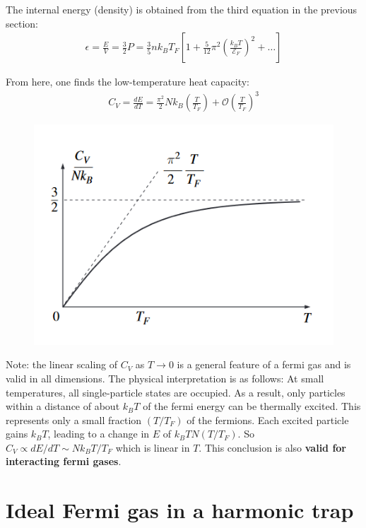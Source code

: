 \documentclass{book}
\theoremstyle{definition}
\newcommand{\f}[2]{\frac{#1}{#2}}
\newcommand{\lp}{\left(}
\newcommand{\rp}{\right)}
\newcommand{\lb}{\left[}
\newcommand{\rb}{\right]}
\begin{document}
The internal energy (density) is obtained from the third equation in the previous section: 
\begin{align*}
	\boxed{\epsilon = \f{E}{V} = \f{3}{2}P = \f{3}{5}nk_B T_F \lb 1 + \f{5}{12}\pi^2 \lp \f{k_B T}{\mathcal{E}_F} \rp^2 + \dots \rb}
\end{align*}

From here, one finds the low-temperature heat capacity:
\begin{align*}
	C_V = \f{dE}{dT} = \f{\pi^2}{2}Nk_B \lp \f{T}{T_F} \rp + \mathcal{O}\lp \f{T}{T_F}  \rp^3
\end{align*}

\begin{figure}[!htb]
	\centering
	\includegraphics[scale=0.8]{figures/heat_cap.png}
\end{figure}


Note: the linear scaling of $C_V$ as $T\to 0$ is a general feature of a fermi gas and is valid in all dimensions. The physical interpretation is as follows: At small temperatures, all single-particle states are occupied. As a result, only particles within a distance of about $k_B T$ of the fermi energy can be thermally excited. This represents only a small fraction $(T/T_F)$ of the fermions. Each excited particle gains $k_B T$, leading to a change in $E$ of $k_B T N (T/T_F)$. So $C_V \propto dE/dT \sim N k_BT/T_F$ which is linear in $T$. This conclusion is also \textbf{valid for interacting fermi gases}. 



\section{Ideal Fermi gas in a harmonic trap}
\end{document}

